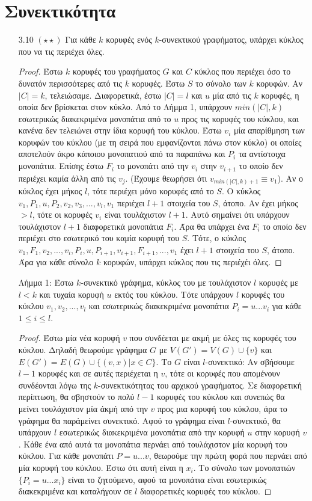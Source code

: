 \documentclass[a4paper, oneside, 11pt]{article}
\begin{document}
\section{Συνεκτικότητα}
\begin{enumerate}
   \item[3.10 $(\star\star)$]
Για κάθε $k$ κορυφές ενός $k$-συνεκτικού γραφήματος, υπάρχει κύκλος που να τις περιέχει όλες.
\begin{proof}
Έστω $k$ κορυφές του γραφήματος $G$ και $C$ κύκλος που περιέχει όσο το δυνατόν περισσότερες από τις $k$ κορυφές. Έστω $S$ το σύνολο των $k$ κορυφών. Αν $|C|=k$, τελειώσαμε. 
Διαφορετικά, έστω $|C|=l$ και $u$ μία από τις 
$k$ κορυφές, η οποία δεν 
βρίσκεται στον κύκλο. Από το Λήμμα 1, υπάρχουν $min(|C|,k)$ εσωτερικώς διακεκριμένα μονοπάτια από το $u$ προς τις κορυφές του κύκλου, και κανένα δεν τελειώνει στην ίδια κορυφή του κύκλου. Έστω $v_i$ μία
απαρίθμηση των κορυφών του κύκλου (με τη σειρά που εμφανίζονται πάνω στον κύκλο) οι οποίες αποτελούν άκρο κάποιου μονοπατιού από τα παραπάνω 
και $P_i$ τα αντίστοιχα μονοπάτια. Επίσης έστω $F_i$ το μονοπάτι από 
την $v_i$ στην $v_{i+1}$ το οποίο δεν περιέχει καμία άλλη από τις $v_j$. (Έχουμε θεωρήσει ότι $v_{min(|C|,k)+1}\equiv v_1$). Αν ο κύκλος έχει μήκος $l$, τότε περιέχει μόνο κορυφές από το $S$. Ο κύκλος
$v_1, P_1, u, P_2, v_2, v_3, ..., v_l, v_1$ περιέχει $l+1$ στοιχεία του $S$, άτοπο. Αν έχει μήκος $>l$, τότε οι κορυφές $v_i$ είναι τουλάχιστον $l+1$. Αυτό σημαίνει ότι υπάρχουν τουλάχιστον $l+1$
διαφορετικά μονοπάτια $F_i$. Άρα θα υπάρχει ένα $F_i$ το οποίο δεν περιέχει στο εσωτερικό του καμία κορυφή του $S$. Τότε, ο κύκλος $v_1, F_1, v_2, ..., v_i, P_i, u, P_{i+1}, v_{i+1}, F_{i+1}, ...,v_1$ 
έχει $l+1$ στοιχεία του $S$, άτοπο.
Άρα για κάθε σύνολο $k$ κορυφών, υπάρχει κύκλος που τις περιέχέι όλες.
\end{proof}

Λήμμα 1: Έστω $k$-συνεκτικό γράφημα, κύκλος του με τουλάχιστον $l$ κορυφές με $l<k$ και τυχαία κορυφή $u$ εκτός του κύκλου. Τότε υπάρχουν $l$ κορυφές του κύκλου $v_1, v_2, ..., v_l$ και 
εσωτερικώς διακεκριμένα μονοπάτια $P_i = u...v_i$ για κάθε $1\leq i\leq l$.
\begin{proof}
Έστω μία νέα κορυφή $v$ που συνδέεται με ακμή με όλες τις κορυφές του κύκλου. Δηλαδή θεωρούμε γράφημα $G$ με $V(G')=V(G)\cup \{v\}$ και $E(G')=E(G)\cup \{(v,x)|x\in C\}$. Το $G$ είναι $l$-συνεκτικό:
Αν σβήσουμε $l-1$ κορυφές και σε αυτές περιέχεται η $v$, τότε οι κορυφές που απομένουν συνδέονται λόγω της $k$-συνεκτικότητας του αρχικού γραφήματος. Σε διαφορετική περίπτωση, θα σβηστούν το πολύ $l-1$
κορυφές του κύκλου και συνεπώς θα μείνει τουλάχιστον μία άκμή από την $v$ προς μια κορυφή του κύκλου, άρα το γράφημα θα παράμείνει συνεκτικό. Αφού το γράφημα είναι $l$-συνεκτικό, θα υπάρχουν $l$ εσωτερικώς
διακεκριμένα μονοπάτια από την κορυφή $u$ στην κορυφή $v$. Κάθε ένα από αυτά τα μονοπάτια περνάει από τουλάχιστον μία κορυφή του κύκλου. Για κάθε μονοπάτι $P = u...v$, θεωρούμε την πρώτη φορά που περνάει
από μία κορυφή του κύκλου. Έστω ότι αυτή είναι η $x_i$. Το σύνολο των μονοπατιών $\{P_i = u...x_i\}$ είναι το ζητούμενο, αφού τα μονοπάτια είναι εσωτερικώς διακεκριμένα και καταλήγουν σε $l$ διαφορετικές
κορυφές του κύκλου.


\end{proof}
\end{enumerate}
\end{document}
